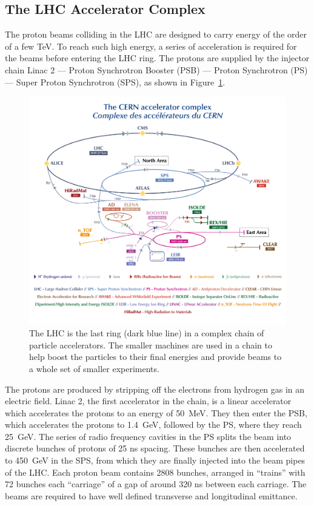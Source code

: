 	
\subsection{The LHC Accelerator Complex}

The proton beams colliding in the LHC are designed to carry energy 
of the order of a few TeV. To reach such high energy, a series of 
acceleration is required for the beams before entering the LHC ring. 
The protons are supplied by the injector chain Linac 2 — Proton Synchrotron 
Booster (PSB) — Proton Synchrotron (PS) — Super Proton Synchrotron (SPS), 
as shown in Figure~\ref{fig:accelerator_complex}.

\begin{figure}[bht]
	\begin{centering}	
	\includegraphics[width=.9\textwidth]{Detector_plots/accelerator_complex_smaller.png}
	\caption{The LHC is the last ring (dark blue line) in a complex chain of 
	particle accelerators. The smaller machines are used in a chain to help boost 
	the particles to their final energies and provide beams to a whole set of smaller experiments.
		}
	\label{fig:accelerator_complex}
	\end{centering}
\end{figure}

The protons are produced by stripping off the electrons from hydrogen gas
in an electric field. Linac 2, the first accelerator in the chain, 
is a linear accelerator which accelerates the protons to an energy of 50~MeV. 
They then enter the PSB, which accelerates the protons to 1.4~GeV, followed by 
the PS, where they reach 25~GeV. The series of radio frequency cavities in 
the PS splits the beam into discrete bunches of protons of 25 ns spacing. 
These bunches are then accelerated to 450~GeV in the SPS, from which they 
are finally injected into the beam pipes of the LHC. 
Each proton beam contains 2808 bunches, arranged in ``trains''
with 72 bunches each ``carriage'' of a gap of around 320 ns between each carriage. 
The beams are required to have well defined transverse and longitudinal emittance. 

